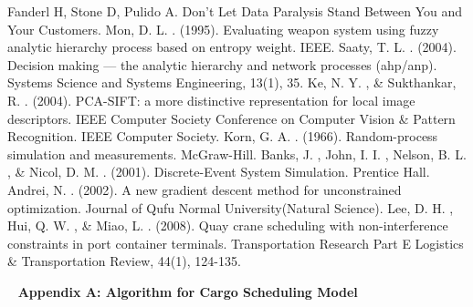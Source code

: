 \documentclass{mcmthesis}
\begin{document}
\newpage
\begin{thebibliography}{99}
Fanderl H, Stone D, Pulido A. Don't Let Data Paralysis Stand Between You and Your Customers. 
Mon, D. L. . (1995). Evaluating weapon system using fuzzy analytic hierarchy process based on entropy weight. IEEE.
Saaty, T. L. . (2004). Decision making — the analytic hierarchy and network processes (ahp/anp). Systems Science and Systems Engineering, 13(1), 35.
Ke, N. Y. , \&  Sukthankar, R. . (2004). PCA-SIFT: a more distinctive representation for local image descriptors. IEEE Computer Society Conference on Computer Vision \& Pattern Recognition. IEEE Computer Society.
Korn, G. A. . (1966). Random-process simulation and measurements. McGraw-Hill.
Banks, J. ,  John, I. I. ,  Nelson, B. L. , \&  Nicol, D. M. . (2001). Discrete-Event System Simulation. Prentice Hall. 
Andrei, N. . (2002). A new gradient descent method for unconstrained optimization. Journal of Qufu Normal University(Natural Science).
Lee, D. H. ,  Hui, Q. W. , \&  Miao, L. . (2008). Quay crane scheduling with non-interference constraints in port container terminals. Transportation Research Part E Logistics \& Transportation Review, 44(1), 124-135.

\end{thebibliography}
\ 
\noindent
\Large{\textbf{Appendix A: Algorithm for Cargo Scheduling Model}} \\
\end{document}
